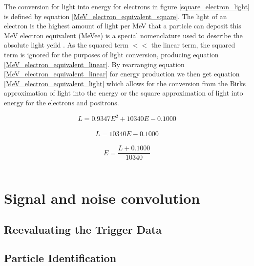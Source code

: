 \documentclass[12pt,a4paper]{article}
\begin{document}
The conversion for light into energy for electrons in figure \ref{square_electron_light} is defined by equation \ref{MeV_electron_equivalent_square}. The light of an electron is the highest amount of light per MeV that a particle can deposit this MeV electron equivalent (MeVee) is a special nomenclature used to describe the absolute light yeild \cite{rad_det_and_meas}. As the squared term $ << $ the linear term, the squared term is ignored for the purposes of light conversion, producing equation \ref{MeV_electron_equivalent_linear}. By rearranging equation \ref{MeV_electron_equivalent_linear} for energy production we then get equation \ref{MeV_electron_equivalent_light} which allows for the conversion from the Birks approximation of light into the energy or the square approximation of light into energy for the electrons and positrons.

\begin{equation}
L = 0.9347E^2 + 10340E - 0.1000
\label{MeV_electron_equivalent_square}
\end{equation}\\

\begin{equation}
L = 10340E - 0.1000
\label{MeV_electron_equivalent_linear}
\end{equation}\\

\begin{equation}
E = \frac{L +0.1000}{10340} 
\label{MeV_electron_equivalent_light}
\end{equation}\\

\section{Signal and noise convolution}
\subsection{Reevaluating the Trigger Data}
\subsection{Particle Identification}
\end{document}

